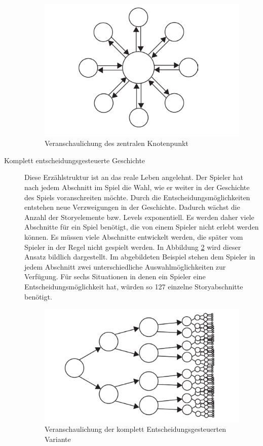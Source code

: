 \begin{description}
\begin{figure}[H]
    \centering
    \includegraphics[width=.8\textwidth]{files/story/storyZentralKnoten}
    \caption{Veranschaulichung des zentralen Knotenpunkt \cite[S. 98]{Adams:1515529}}
    \label{pic:storyKnoten}
\end{figure}


 
\item[Komplett entscheidungsgesteuerte Geschichte]

Diese Erzählstruktur ist an das reale Leben angelehnt. Der Spieler hat nach jedem Abschnitt im Spiel die Wahl, wie er weiter in der Geschichte des Spiels voranschreiten möchte. Durch die Entscheidungsmöglichkeiten entstehen neue Verzweigungen in der Geschichte. Dadurch wächst die Anzahl der Storyelemente bzw. Levels exponentiell. Es werden daher viele Abschnitte für ein Spiel benötigt, die von einem Spieler nicht erlebt werden können. Es müssen viele Abschnitte entwickelt werden, die später vom Spieler in der Regel nicht gespielt werden. In Abbildung \ref{pic:storyEntscheidung} wird dieser Ansatz bildlich dargestellt. Im abgebildeten Beispiel stehen dem Spieler in jedem Abschnitt zwei unterschiedliche Auswahlmöglichkeiten zur Verfügung. Für sechs Situationen in denen ein Spieler eine Entscheidungsmöglichkeit hat, würden so 127 einzelne Storyabschnitte benötigt. \cite[S. 99]{Adams:1515529} 


 
\begin{figure}[H]
    \centering
    \includegraphics[width=.8\textwidth]{files/story/storyEntscheidungen}
    \caption{Veranschaulichung der komplett Entscheidungsgesteuerten Variante}
    \label{pic:storyEntscheidung}
\end{figure} 



\end{description}
